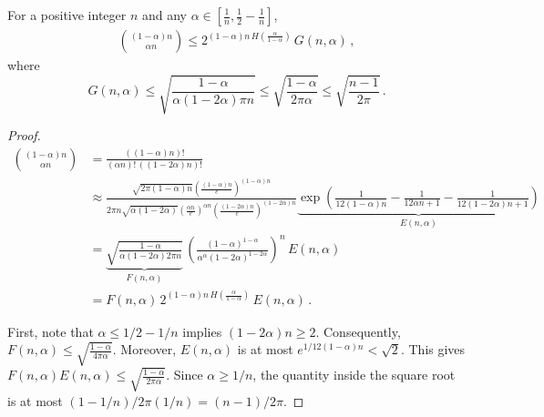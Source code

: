 \begin{corollary}\label{coro:nchoosek_2}
For a positive integer $n$ and any $\alpha \in [\frac{1}{n},\frac{1}{2} - \frac{1}{n}]$, 
\begin{align}\label{eq:nck_2}
{(1-\alpha)n \choose \alpha n} \leq 2^{(1-\alpha)n\,H\left( \frac{\alpha}{1-\alpha} \right)}\, G(n, \alpha)\,,
\end{align}
where \[
 G(n,\alpha) \leq \sqrt{\frac{1-\alpha}{\alpha(1-2\alpha) \pi n} } \leq \sqrt{\frac{1-\alpha}{ 2 \pi \alpha} } \leq \sqrt{ \frac{n-1}{2 \pi} }\, . 
 \]
\end{corollary}
\begin{proof}

\begin{align*}
{(1-\alpha)n \choose \alpha n}
&= \frac{((1-\alpha)n)!}{(\alpha n)!\, \left( (1-2\alpha)n \right)! }\\
&\approx \frac{\sqrt{2\pi (1-\alpha)n}(\frac{(1-\alpha)n}{e})^{(1-\alpha)n}}{2\pi n\sqrt{\alpha (1-2\alpha)}(\frac{\alpha n}{e})^{\alpha n}(\frac{(1-2\alpha)n}{e})^{(1-2\alpha)n} } \underbrace{ \exp\left( \frac{1}{12(1-\alpha)n} - \frac{1}{12\alpha n + 1} - \frac{1}{12(1-2\alpha)n+1}\right) }_{E(n,\alpha)}  \\
&= \underbrace{ \sqrt{\frac{1-\alpha}{\alpha(1-2\alpha) 2 \pi n} } }_{F(n, \alpha)}\, \left( \frac{(1-\alpha)^{1-\alpha}}{\alpha^\alpha (1-2\alpha)^{1-2\alpha}} \right)^n\, E(n, \alpha)\\
&=F(n, \alpha) \, 2^{(1-\alpha)n\,H\left( \frac{\alpha}{1-\alpha} \right)} \, E(n, \alpha)\, .
\end{align*}

First, note that $\alpha \leq 1/2 - 1/n$ implies $(1-2\alpha)n \geq 2$. Consequently, $F(n, \alpha) \leq \sqrt{\frac{1-\alpha}{ 4 \pi \alpha} }$. Moreover, $E(n,\alpha)$ is at most $e^{1/12(1-\alpha)n} < \sqrt{2}$. This gives $F(n, \alpha)E(n, \alpha) \leq \sqrt{\frac{1-\alpha}{ 2 \pi \alpha} }$. Since $\alpha \geq 1/n$, the quantity inside the square root is at most $(1-1/n)/2 \pi(1/n) = (n-1)/2\pi$.

\end{proof}
